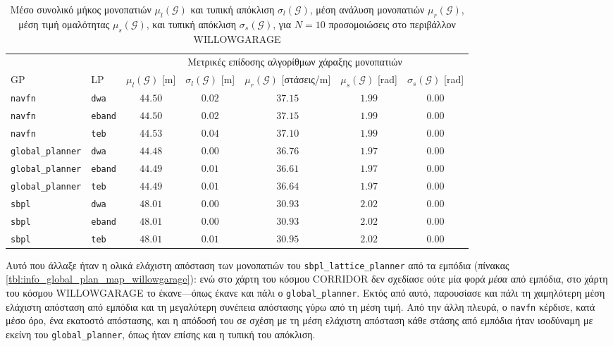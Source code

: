 \begin{table}[h]\hspace{-1.0cm}
\renewcommand{\arraystretch}{1.3}
\begin{tabular}{llccccc}
  & & \multicolumn{5}{c}{Μετρικές επίδοσης αλγορίθμων χάραξης μονοπατιών} \\
  \cline{3-7}
  GP & LP & $\mu_{l}(\bm{\mathcal{G}})$ [m] & $\sigma_{l}(\bm{\mathcal{G}})$ [m] & $\mu_r(\bm{\mathcal{G}})$ [στάσεις/m] & $\mu_{s}(\bm{\mathcal{G}})$ [rad] & $\sigma_{s}(\bm{\mathcal{G}})$ [rad] \\ \toprule
  \texttt{navfn} & \texttt{dwa} & $44.50$ & $0.02$ & $37.15$ & $1.99$ & $0.00$ \\
  \texttt{navfn} & \texttt{eband} & $44.50$ & $0.02$ & $37.15$ & $1.99$ & $0.00$ \\
  \texttt{navfn} & \texttt{teb} & $44.53$ & $0.04$ & $37.10$ & $1.99$ & $0.00$ \\
  \texttt{global\_planner} & \texttt{dwa} & $44.48$ & $0.00$ & $36.76$ & $1.97$ & $0.00$ \\
  \texttt{global\_planner} & \texttt{eband} & $44.49$ & $0.01$ & $36.61$ & $1.97$ & $0.00$ \\
  \texttt{global\_planner} & \texttt{teb} & $44.49$ & $0.01$ & $36.64$ & $1.97$ & $0.00$ \\
  \texttt{sbpl} & \texttt{dwa} & $48.01$ & $0.00$ & $30.93$ & $2.02$ & $0.00$ \\
  \texttt{sbpl} & \texttt{eband} & $48.01$ & $0.00$ & $30.93$ & $2.02$ & $0.00$ \\
  \texttt{sbpl} & \texttt{teb} & $48.01$ & $0.01$ & $30.95$ & $2.02$ & $0.00$ \\ \bottomrule
\end{tabular}
\caption{\small Μέσο συνολικό μήκος μονοπατιών $\mu_{l}(\bm{\mathcal{G}})$ και τυπική
         απόκλιση $\sigma_{l}(\bm{\mathcal{G}})$, μέση ανάλυση μονοπατιών
         $\mu_r(\bm{\mathcal{G}})$, μέση τιμή ομαλότητας
         $\mu_{s}(\bm{\mathcal{G}})$, και τυπική απόκλιση
         $\sigma_{s}(\bm{\mathcal{G}})$, για $N=10$ προσομοιώσεις στο περιβάλλον
         WILLOWGARAGE}
\label{tbl:info_global_plan_willowgarage}
\end{table}

Αυτό που άλλαξε ήταν η ολικά ελάχιστη απόσταση των μονοπατιών του
\texttt{sbpl\_lattice\_planner} από τα εμπόδια (πίνακας
\ref{tbl:info_global_plan_map_willowgarage}): ενώ στο χάρτη του κόσμου CORRIDOR
δεν σχεδίασε ούτε μία φορά \textit{μέσα} από εμπόδια, στο χάρτη του κόσμου
WILLOWGARAGE το έκανε---όπως έκανε και πάλι ο \texttt{global\_planner}. Εκτός
από αυτό, παρουσίασε και πάλι τη χαμηλότερη μέση ελάχιστη απόσταση από εμπόδια
και τη μεγαλύτερη συνέπεια απόστασης γύρω από τη μέση τιμή. Από την άλλη
πλευρά, ο \texttt{navfn} κέρδισε, κατά μέσο όρο, ένα εκατοστό απόστασης, και η
απόδοσή του σε σχέση με τη μέση ελάχιστη απόσταση κάθε στάσης από εμπόδια
ήταν ισοδύναμη με εκείνη του \texttt{global\_planner}, όπως ήταν επίσης και η
τυπική του απόκλιση.

